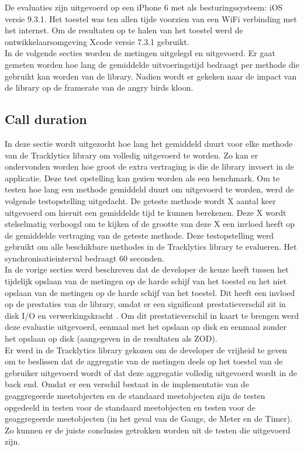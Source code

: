 De evaluaties zijn uitgevoerd op een iPhone 6 \cite{iPhone} met als besturingssysteem: iOS versie 9.3.1. Het toestel was ten allen tijde voorzien van een WiFi verbinding met het internet. Om de resultaten op te halen van het toestel werd de ontwikkelaarsomgeving Xcode \cite{Xcode} versie 7.3.1 gebruikt.\\

In de volgende secties worden de metingen uitgelegd en uitgevoerd. Er gaat gemeten worden hoe lang de gemiddelde uitvoeringstijd bedraagt per methode die gebruikt kan worden van de library. Nadien wordt er gekeken naar de impact van de library op de framerate van de angry birds kloon.\\

\subsection{Call duration}
In deze sectie wordt uitgezocht hoe lang het gemiddeld duurt voor elke methode van de Tracklytics library om volledig uitgevoerd te worden. Zo kan er ondervonden worden hoe groot de extra vertraging is die de library invoert in de applicatie. Deze test opstelling kan gezien worden als een benchmark. Om te testen hoe lang een methode gemiddeld duurt om uitgevoerd te worden, werd de volgende testopstelling uitgedacht. De geteste methode wordt X aantal keer uitgevoerd om hieruit een gemiddelde tijd te kunnen berekenen. Deze X wordt stelselmatig verhoogd om te kijken of de grootte van deze X een invloed heeft op de gemiddelde vertraging van de geteste methode. Deze testopstelling werd gebruikt om alle beschikbare methodes in de Tracklytics library te evalueren. Het synchronisatieinterval bedraagt 60 seconden. \\

In de vorige secties werd beschreven dat de developer de keuze heeft tussen het tijdelijk opslaan van de metingen op de harde schijf van het toestel en het niet opslaan van de metingen op de harde schijf van het toestel. Dit heeft een invloed op de prestaties van de library, omdat er een significant prestatieverschil zit in disk I/O en verwerkingskracht \cite{diskIO}. Om dit prestatieverschil in kaart te brengen werd deze evaluatie uitgevoerd, eenmaal met het opslaan op disk en eenmaal zonder het opslaan op disk (aangegeven in de resultaten als ZOD).\\

Er werd in de Tracklytics library gekozen om de developer de vrijheid te geven om te beslissen dat de aggregatie van de metingen deels op het toestel van de gebruiker uitgevoerd wordt of dat deze aggregatie volledig uitgevoerd wordt in de back end. Omdat er een verschil bestaat in de implementatie van de geaggregeerde meetobjecten en de standaard meetobjecten zijn de testen opgedeeld in testen voor de standaard meetobjecten en testen voor de geaggregeerde meetobjecten (in het geval van de Gauge, de Meter en de Timer). Zo kunnen er de juiste conclusies getrokken worden uit de testen die uitgevoerd zijn.\\

